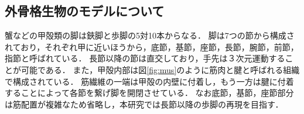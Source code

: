 \documentclass{jarticle}
\begin{document}
\vspace*{-1mm}
\subsection{外骨格生物のモデルについて}

蟹などの甲殻類の脚は鋏脚と歩脚の5対10本からなる．
脚は7つの節から構成されており，それぞれ甲に近いほうから，底節，基節，座節，長節，腕節，前節，指節と呼ばれている\cite{crab}．
長節以降の節は直交しており，手先は３次元運動することが可能である．
また，甲殻内部は図\ref{fig:mus}のように筋肉と腱と呼ばれる組織で構成されている．
筋繊維の一端は甲殻の内壁に付着し，もう一方は腱に付着することによって各節を繋げ脚を開閉させている．
なお底節，基節，座節部分は筋配置が複雑なため省略し，本研究では長節以降の歩脚の再現を目指す．
\end{document}
